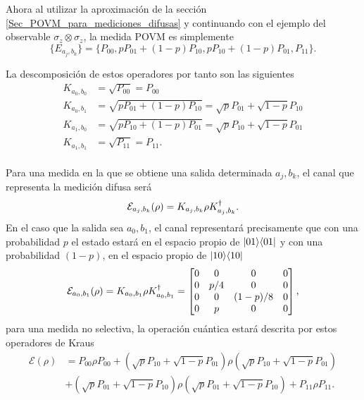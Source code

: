 Ahora al utilizar la aproximación de la sección {\ref{Sec_POVM_para_mediciones_difusas}} y continuando con el ejemplo del observable $\sigma_z \otimes \sigma_z$, la medida POVM es simplemente \[\{E_{a_j, b_k}\}= \{P_{00},p P_{01}+(1-p)P_{10},p P_{10}+(1-p)P_{01},P_{11}\}.\] 


La descomposición de estos operadores por tanto son las siguientes
\begin{equation}
    \begin{split}
        K_{a_0,b_0}&=\sqrt{P_{00}}=P_{00}\\
        K_{a_0,b_1}&=\sqrt{p P_{01}+(1-p)P_{10}}=\sqrt{p}P_{01}+\sqrt{1-p}P_{10}\\
        K_{a_1,b_0}&=\sqrt{p P_{10}+(1-p)P_{01}}=\sqrt{p}P_{10}+\sqrt{1-p}P_{01}\\
        K_{a_1,b_1}&=\sqrt{P_{11}}=P_{11}.\\
\end{split}
\end{equation} 

Para una medida en la que se obtiene una salida determinada $a_j,b_k$, el canal que representa la medición difusa será \[\mathcal{E}_{a_j,b_k}(\rho)=K_{a_j,b_k}\rho K_{a_j,b_k}^\dagger.\] En el caso que la salida sea $a_0,b_1$, el canal representará precisamente que con una probabilidad $p$ el estado estará en el espacio propio de $|01\rangle \langle 01|$ y con una probabilidad $(1-p)$, en el espacio propio de $|10\rangle \langle10|$
\[\mathcal{E}_{a_0,b_1}(\rho)=K_{a_0,b_1}\rho K_{a_0,b_1}^\dagger=\begin{bmatrix}
    0&0&0&0\\
    0&p/4&0&0\\
    0&0&(1-p)/8&0\\
    0&p&0&0\\
\end{bmatrix},\]
para una medida no selectiva, la operación cuántica estará descrita por estos operadores de Kraus \[
\begin{split}
    \mathcal{E}(\rho)&=  P_{00}\rho P_{00}+(\sqrt{p}P_{10}+\sqrt{1-p}P_{01})\rho(\sqrt{p}P_{10}+\sqrt{1-p}P_{01})\\
    &+ (\sqrt{p}P_{01}+\sqrt{1-p}P_{10})\rho (\sqrt{p} P_{01}+\sqrt{1-p}P_{10})+P_{11}\rho P_{11}.\\
\end{split}
\]


